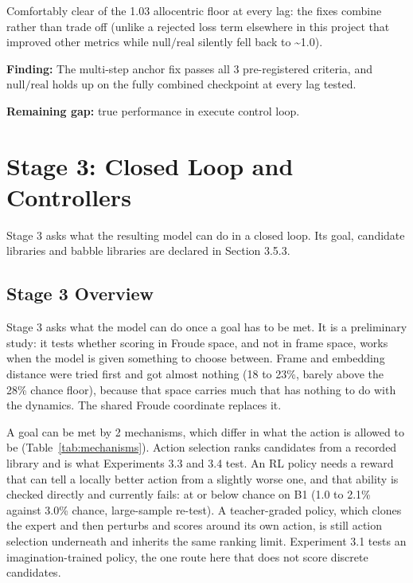 \documentclass[12pt,a4paper,oneside]{report}
\begin{document}
Comfortably clear of the 1.03 allocentric floor at every lag: the fixes combine rather than trade off (unlike a rejected loss term elsewhere in this project that improved other metrics while $\mathrm{null}/\mathrm{real}$ silently fell back to \textasciitilde{}1.0).


\textbf{Finding:} The multi-step anchor fix passes all 3 pre-registered criteria, and $\mathrm{null}/\mathrm{real}$ holds up on the fully combined checkpoint at every lag tested.


\textbf{Remaining gap:} true performance in execute control loop.

\section{Stage 3: Closed Loop and Controllers}
Stage 3 asks what the resulting model can do in a closed loop. Its goal, candidate libraries and babble libraries are declared in Section 3.5.3.

\subsection{Stage 3 Overview}
Stage 3 asks what the model can do once a goal has to be met. It is a preliminary study: it tests whether scoring in Froude space, and not in frame space, works when the model is given something to choose between. Frame and embedding distance were tried first and got almost nothing (18 to 23\%, barely above the 28\% chance floor), because that space carries much that has nothing to do with the dynamics. The shared Froude coordinate replaces it.

A goal can be met by 2 mechanisms, which differ in what the action is allowed to be (Table~\ref{tab:mechanisms}). Action selection ranks candidates from a recorded library and is what Experiments 3.3 and 3.4 test. An RL policy needs a reward that can tell a locally better action from a slightly worse one, and that ability is checked directly and currently fails: at or below chance on B1 (1.0 to 2.1\% against 3.0\% chance, large-sample re-test). A teacher-graded policy, which clones the expert and then perturbs and scores around its own action, is still action selection underneath and inherits the same ranking limit. Experiment 3.1 tests an imagination-trained policy, the one route here that does not score discrete candidates.
\end{document}
